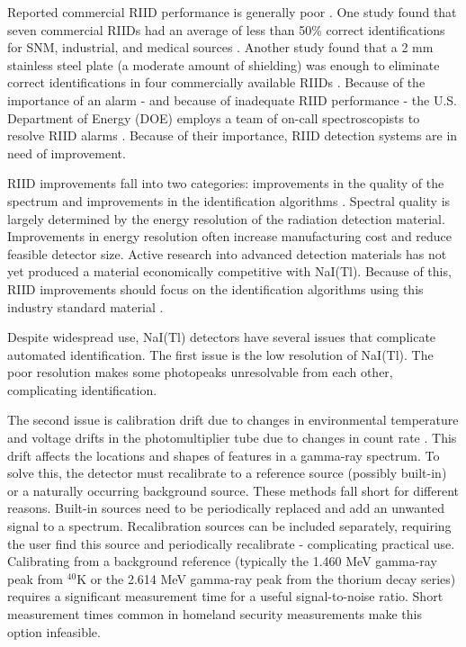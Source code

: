 Reported commercial RIID performance is generally poor \cite{pibida2004,blackadar2003,blackadar2004}. One study found that seven commercial RIIDs had an average of less than 50\% correct identifications for SNM, industrial, and medical sources \cite{blackadar2003}. Another study found that a 2 mm stainless steel plate (a moderate amount of shielding) was enough to eliminate correct identifications in four commercially available RIIDs \cite{pibida2004}. Because of the importance of an alarm - and because of inadequate RIID performance - the U.S. Department of Energy (DOE) employs a team of on-call spectroscopists to resolve RIID alarms \cite{burr2009}. Because of their importance, RIID detection systems are in need of improvement.


RIID improvements fall into two categories: improvements in the quality of the spectrum and improvements in the identification algorithms \cite{swoboda2004}. Spectral quality is largely determined by the energy resolution of the radiation detection material. Improvements in energy resolution often increase manufacturing cost and reduce feasible detector size. Active research into advanced detection materials has not yet produced a material economically competitive with NaI(Tl). Because of this, RIID improvements should focus on the identification algorithms using this industry standard material \cite{blackadar2003}.


Despite widespread use, NaI(Tl) detectors have several issues that complicate automated identification. The first issue is the low resolution of NaI(Tl). The poor resolution makes some photopeaks unresolvable from each other, complicating identification.

The second issue is calibration drift due to changes in environmental temperature and voltage drifts in the photomultiplier tube due to changes in count rate \cite{knoll,gilmore}. This drift affects the locations and shapes of features in a gamma-ray spectrum. To solve this, the detector must recalibrate to a reference source (possibly built-in) or a naturally occurring background source. These methods fall short for different reasons. Built-in sources need to be periodically replaced and add an unwanted signal to a spectrum. Recalibration sources can be included separately, requiring the user find this source and periodically recalibrate - complicating practical use. Calibrating from a background reference (typically the 1.460 MeV gamma-ray peak from $^{40}$K or the 2.614 MeV gamma-ray peak from the thorium decay series) requires a significant measurement time for a useful signal-to-noise ratio. Short measurement times common in homeland security measurements make this option infeasible.

